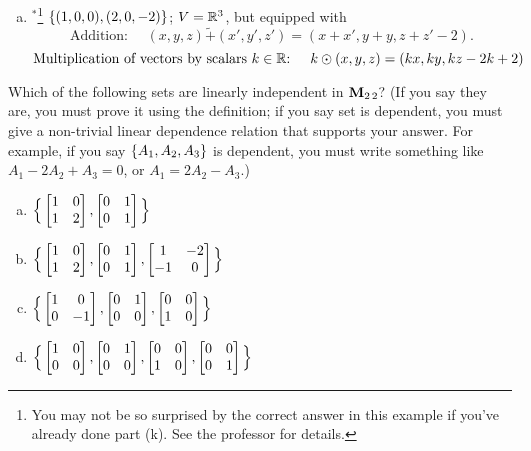 \begin{prob}
\begin{enumerate}[a)]
\medskip
%
\item$^\ast$\footnote{You may not be so surprised by the correct answer in this example if you've already done part (k). See the professor for details.}  $\{(1,0,0), (2,0,-2) \}$; $V=\mathbb{R}^3$, but equipped with   $$\text{Addition: }\quad(x,y,z) \tilde+ (x',y',z')=(x+x', y+y,z+z'-2).$$  $$\text{Multiplication of vectors  by  scalars $k\in \mathbb{R}$: }\quad k\odot (x,y,z)=(kx, ky, kz-2k+2)$$\medskip 
\end{enumerate}

\end{prob} \begin{prob} \label{prob07.2} Which of the following sets are linearly independent in $\mathbf{M}_{2 \,2}$? (If you say they are, you must prove it using the definition; if you say   set is dependent, you must give a non-trivial linear dependence relation that supports your answer. For example, if you say $\{A_1, A_2, A_3 \}$ is dependent, you must write something like  $A_1-2 A_2 +A_3=0$, or $A_1=2 A_2 -A_3$.)
\medskip
\begin{enumerate}[a)]

\item  $\Big\{\bmatrix 1&0\\1&2\endbmatrix, \bmatrix 0&1\\0&1\endbmatrix \Big\}$   \medskip
%

\item\sov  $\Big\{\bmatrix 1&0\\1&2\endbmatrix, \bmatrix 0&1\\0&1\endbmatrix , \bmatrix 1&-2\\-1&0\endbmatrix \Big\}$   \medskip
%

\item  $\Big\{\bmatrix 1&0\\0&-1\endbmatrix, \bmatrix 0&1\\0&0\endbmatrix,\bmatrix 0&0\\1&0\endbmatrix\Big\}$  \medskip
%
 \item\sov  $\Big\{\bmatrix 1&0\\0&0\endbmatrix, \bmatrix 0&1\\0&0\endbmatrix,\bmatrix 0&0\\1&0\endbmatrix,\bmatrix 0&0\\0&1\endbmatrix \Big\}$  \medskip
%

\end{enumerate}


\end{prob}
